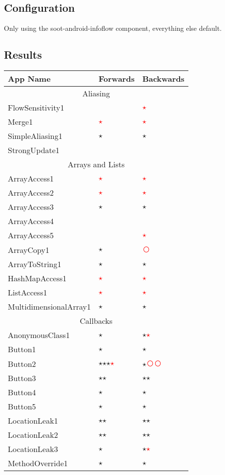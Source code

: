 \documentclass[../draft.tex]{subfiles}
\newcommand{\fp}{\textcolor{white}{\textcircled{\textcolor{red}{$\star$}}}}
\newcommand{\fn}{\textcolor{red}{\textcircled{ }}}
\newcommand{\tp}[0]{\textcircled{$\star$}}
\newcommand{\tsub}[1]{\multicolumn{3}{c}{#1}\\\hline}
\begin{document}
    \subsection{Configuration}
    Only using the soot-android-infoflow component, everything else default.

    \subsection{Results}
    \begin{longtable}{l | l | l}
        \textbf{App Name} & \textbf{Forwards} & \textbf{Backwards}\\
        \hline\hline
        \endhead
        \tsub{Aliasing}
        FlowSensitivity1 & & \fp\\
        Merge1 & \fp & \fp\\
        SimpleAliasing1 & \tp & \tp\\
        StrongUpdate1 & &\\
        \hline
        \tsub{Arrays and Lists}
        ArrayAccess1 & \fp & \fp\\
        ArrayAccess2 & \fp & \fp\\
        ArrayAccess3 & \tp & \tp\\
        ArrayAccess4 &  & \\
        ArrayAccess5 &  & \fp\\
        ArrayCopy1 & \tp & \fn\\
        ArrayToString1 & \tp & \tp\\
        HashMapAccess1 & \fp & \fp\\
        ListAccess1 & \fp & \fp \\
        MultidimensionalArray1 & \tp & \tp\\
        \hline
        \tsub{Callbacks}
        AnonymousClass1 & \tp & \tp \fp\\
        Button1 & \tp & \tp \\
        Button2 & \tp \tp \tp \fp & \tp \fn \fn \\
        Button3 & \tp \tp & \tp \tp\\
        Button4 & \tp & \tp\\
        Button5 & \tp & \tp\\
        LocationLeak1 & \tp \tp & \tp \tp\\
        LocationLeak2 & \tp \tp & \tp \tp\\
        LocationLeak3 & \tp & \tp \fp\\
        MethodOverride1 & \tp & \tp\\

\end{longtable}
\end{document}
